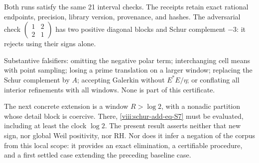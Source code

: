 
Both runs satisfy the same 21 interval checks.
The receipts retain exact rational endpoints, precision, library
version, provenance, and hashes. The adversarial check
\(\begin{pmatrix}1&2\\2&1\end{pmatrix}\) has two positive diagonal
blocks and Schur complement \(-3\): it rejects using their signs alone.

Substantive falsifiers: omitting the negative polar term; interchanging cell
means with point sampling; losing a prime translation on a
larger window; replacing the Schur complement by \(A\); accepting Galerkin without
\(E^*E/\eta\); or conflating all interior refinements with
all windows. None is part of this certificate.

The next concrete extension is a window \(R>\log2\), with
a nonadic partition whose detail block is coercive. There,
\eqref{viii:schur-add-eq-S7} must be evaluated, including at least the clock \(\log2\).
The present result asserts neither that new sign, nor global Weil
positivity, nor RH. Nor does it infer a negation of the corpus from
this local scope: it provides an exact elimination, a certifiable
procedure, and a first settled case extending the preceding baseline case.

